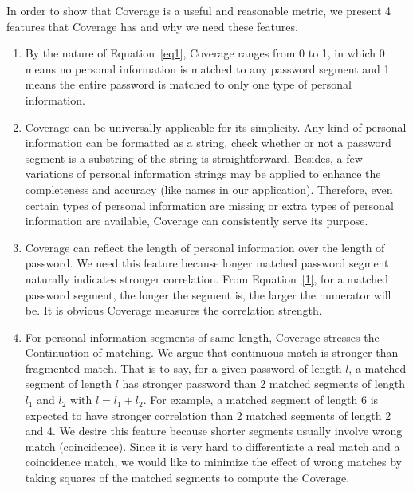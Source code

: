 \documentclass{sig-alternate}
\begin{document}
In order to show that Coverage is a useful and reasonable metric, we present 4 features that Coverage has and why we need these features.

\begin{enumerate}[leftmargin=*]
\item By the nature of Equation~\ref{eq1}, Coverage ranges from 0 to 1, in which 0 means no personal information is matched to any password segment and 1 means the entire password is matched to only one type of personal information. 
\item Coverage can be universally applicable for its simplicity. Any kind of personal information can be formatted as a string, check whether or not a password segment is a substring of the string is straightforward. Besides, a few variations of personal information strings may be applied to enhance the completeness and accuracy (like names in our application). Therefore, even certain types of personal information are missing or extra types of personal information are available, Coverage can consistently serve its purpose.
\item Coverage can reflect the length of personal information over the length of password. We need this feature because longer matched password segment naturally indicates stronger correlation. From Equation~\ref{1}, for a matched password segment, the longer the segment is, the larger the numerator will be. It is obvious Coverage measures the correlation strength. \item For personal information segments of same length, Coverage stresses the Continuation of matching. We argue that continuous match is stronger than fragmented match. That is to say, for a given password of length $l$, a matched segment of length $l$ has stronger password than 2 matched segments of length $l_1$ and $l_2$ with $l = l_1 + l_2$. For example, a matched segment of length 6 is expected to have stronger correlation than 2 matched segments of length 2 and 4. We desire this feature because shorter segments usually involve wrong match (coincidence). Since it is very hard to differentiate a real match and a coincidence match, we would like to minimize the effect of wrong matches by taking squares of the matched segments to compute the Coverage.
\end{enumerate}
\end{document}
